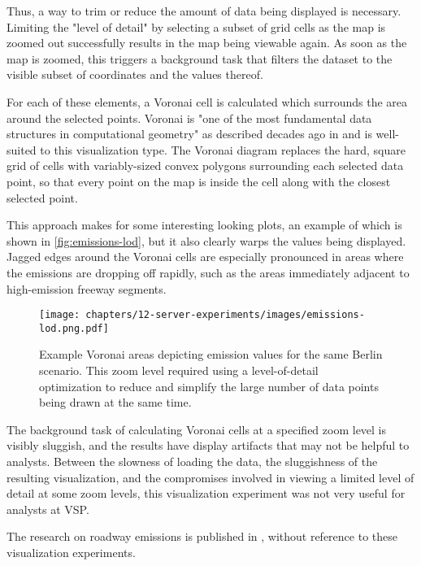 Thus, a way to trim or reduce the amount of data being displayed is necessary. Limiting the "level of detail" by selecting a subset of grid cells as the map is zoomed out successfully results in the map being viewable again. As soon as the map is zoomed, this triggers a background task that filters the dataset to the visible subset of coordinates and the values thereof.

For each of these elements, a Voronai cell is calculated which surrounds the area around the selected points. Voronai is "one of the most fundamental data structures in computational geometry" as described decades ago in \cite{aurenhammer1991voronoi} and is well-suited to this visualization type. The Voronai diagram replaces the hard, square grid of cells with variably-sized convex polygons surrounding each selected data point, so that every point on the map is inside the cell along with the closest selected point.

This approach makes for some interesting looking plots, an example of which is shown in \autoref{fig:emissions-lod}, but it also clearly warps the values being displayed. Jagged edges around the Voronai cells are especially pronounced in areas where the emissions are dropping off rapidly, such as the areas immediately adjacent to high-emission freeway segments.

\begin{figure}[!ht]
  \texttt{[image: chapters/12-server-experiments/images/emissions-lod.png.pdf]}
  \caption[Example Voronai areas depicting emission values for a Berlin scenario]{Example Voronai areas depicting emission values for the same Berlin scenario. This zoom level required using a level-of-detail optimization to reduce and simplify the large number of data points being drawn at the same time.}
  \label{fig:emissions-lod}
\end{figure}

The background task of calculating Voronai cells at a specified zoom level is visibly sluggish, and the results have display artifacts that may not be helpful to analysts. Between the slowness of loading the data, the sluggishness of the resulting visualization, and the compromises involved in viewing a limited level of detail at some zoom levels, this visualization experiment was not very useful for analysts at VSP.

The research on roadway emissions is published in \cite{kaddoura2022exhaust}, without reference to these visualization experiments.

